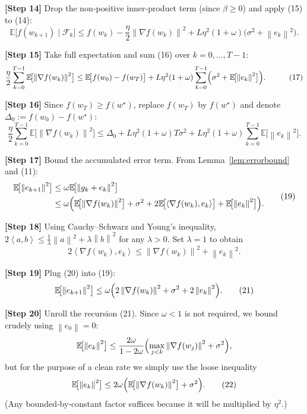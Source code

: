 \documentclass{article}
\newcommand{\E}{\mathbb{E}}
\newcommand{\norm}[1]{\left\lVert #1\right\rVert}
\newcommand{\ip}[2]{\left\langle #1,#2\right\rangle}
\begin{document}
\noindent\textbf{[Step 14]} Drop the non‑positive inner‑product term (since $\beta\ge0$) and apply (15) to (14):
\[
\E\!\bigl[f(w_{k+1})\mid\mathcal{F}_k\bigr]
\le f(w_k)-\frac{\eta}{2}\norm{\nabla f(w_k)}^2
+L\eta^2(1+\omega)\bigl(\sigma^2+\norm{e_k}^2\bigr).
\tag{16}
\]

\noindent\textbf{[Step 15]} Take full expectation and sum (16) over $k=0,\dots,T-1$:
\[
\begin{aligned}
\frac{\eta}{2}\sum_{k=0}^{T-1}\E\!\bigl[\norm{\nabla f(w_k)}^2\bigr]
&\le \E\!\bigl[f(w_0)-f(w_T)\bigr]
+L\eta^2(1+\omega)\sum_{k=0}^{T-1}\Bigl(\sigma^2+\E\!\bigl[\norm{e_k}^2\bigr]\Bigr) .
\end{aligned}
\tag{17}
\]

\noindent\textbf{[Step 16]} Since $f(w_T)\ge f(w^{\star})$, replace $f(w_T)$ by $f(w^{\star})$ and denote
$\Delta_0:=f(w_0)-f(w^{\star})$:
\[
\frac{\eta}{2}\sum_{k=0}^{T-1}\E\!\bigl[\norm{\nabla f(w_k)}^2\bigr]
\le \Delta_0 +L\eta^2(1+\omega)T\sigma^2
+L\eta^2(1+\omega)\sum_{k=0}^{T-1}\E\!\bigl[\norm{e_k}^2\bigr] .
\tag{18}
\]

\noindent\textbf{[Step 17]} Bound the accumulated error term.  From Lemma~\ref{lem:errorbound} and (11):
\[
\begin{aligned}
\E\!\bigl[\norm{e_{k+1}}^2\bigr]
&\le \omega\E\!\bigl[\norm{g_k+e_k}^2\bigr] \\
&\le \omega\Bigl(\E\!\bigl[\norm{\nabla f(w_k)}^2\bigr]+\sigma^2
+2\E\!\bigl[\ip{\nabla f(w_k)}{e_k}\bigr]+\E\!\bigl[\norm{e_k}^2\bigr]\Bigr) .
\end{aligned}
\tag{19}
\]

\noindent\textbf{[Step 18]} Using Cauchy–Schwarz and Young’s inequality,
$2\ip{a}{b}\le \frac{1}{\lambda}\norm{a}^2+\lambda\norm{b}^2$ for any $\lambda>0$.
Set $\lambda=1$ to obtain
\[
2\ip{\nabla f(w_k)}{e_k}\le \norm{\nabla f(w_k)}^2+\norm{e_k}^2 .
\tag{20}
\]

\noindent\textbf{[Step 19]} Plug (20) into (19):
\[
\E\!\bigl[\norm{e_{k+1}}^2\bigr]
\le \omega\Bigl(2\norm{\nabla f(w_k)}^2+\sigma^2+2\norm{e_k}^2\Bigr).
\tag{21}
\]

\noindent\textbf{[Step 20]} Unroll the recursion (21).  Since $\omega<1$ is not required,
we bound crudely using $\norm{e_0}=0$:
\[
\E\!\bigl[\norm{e_k}^2\bigr]\le \frac{2\omega}{1-2\omega}\Bigl(\max_{j<k}\norm{\nabla f(w_j)}^2+\sigma^2\Bigr),
\]
but for the purpose of a clean rate we simply use the loose inequality
\[
\E\!\bigl[\norm{e_k}^2\bigr]\le 2\omega\Bigl(\E\!\bigl[\norm{\nabla f(w_k)}^2\bigr]+\sigma^2\Bigr).
\tag{22}
\]
(Any bounded‑by‑constant factor suffices because it will be multiplied by $\eta^2$.)
\end{document}
